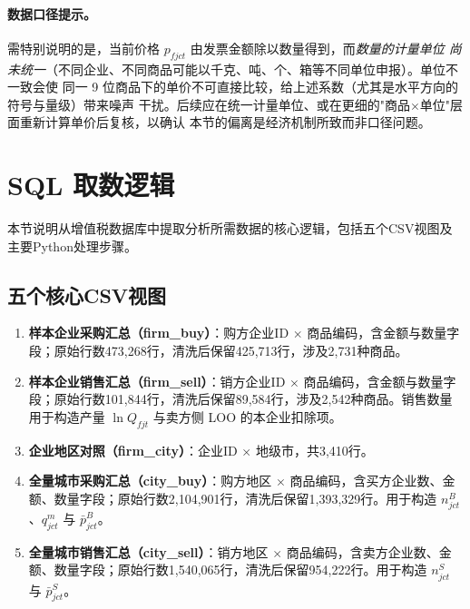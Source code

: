 \documentclass[12pt]{article}
\begin{document}
\paragraph{数据口径提示。}
需特别说明的是，当前价格 $p_{fjct}$ 由发票金额除以数量得到，而\emph{数量的计量单位
尚未统一}（不同企业、不同商品可能以千克、吨、个、箱等不同单位申报）。单位不一致会使
同一 9 位商品下的单价不可直接比较，给上述系数（尤其是水平方向的符号与量级）带来噪声
干扰。后续应在统一计量单位、或在更细的"商品$\times$单位"层面重新计算单价后复核，以确认
本节的偏离是经济机制所致而非口径问题。

\section{SQL 取数逻辑}

本节说明从增值税数据库中提取分析所需数据的核心逻辑，包括五个CSV视图及主要Python处理步骤。

\subsection{五个核心CSV视图}

\begin{enumerate}[nosep, leftmargin=*]

  \item \textbf{样本企业采购汇总（firm\_buy）}：购方企业ID $\times$ 商品编码，含金额与数量字段；原始行数473,268行，清洗后保留425,713行，涉及2,731种商品。

  \item \textbf{样本企业销售汇总（firm\_sell）}：销方企业ID $\times$ 商品编码，含金额与数量字段；原始行数101,844行，清洗后保留89,584行，涉及2,542种商品。销售数量用于构造产量 $\ln Q_{fjt}$ 与卖方侧 LOO 的本企业扣除项。

  \item \textbf{企业地区对照（firm\_city）}：企业ID $\times$ 地级市，共3,410行。

  \item \textbf{全量城市采购汇总（city\_buy）}：购方地区 $\times$ 商品编码，含买方企业数、金额、数量字段；原始行数2,104,901行，清洗后保留1,393,329行。用于构造 $n^B_{jct}$、$q^m_{jct}$ 与 $\bar{p}^{B}_{jct}$。

  \item \textbf{全量城市销售汇总（city\_sell）}：销方地区 $\times$ 商品编码，含卖方企业数、金额、数量字段；原始行数1,540,065行，清洗后保留954,222行。用于构造 $n^S_{jct}$ 与 $\bar{p}^{S}_{jct}$。

\end{enumerate}
\end{document}
